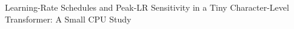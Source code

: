 Learning-Rate Schedules and Peak-LR Sensitivity in a Tiny Character-Level Transformer: A Small CPU Study
